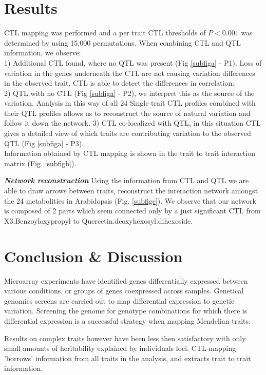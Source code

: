 \documentclass{bioinfo}
\begin{document}
\section{Results}
  CTL mapping was performed and a per trait CTL thresholds of $P < 0.001$ was 
  determined by using 15,000 permutations.
  When combining CTL and QTL information, we observe:\\
  1) Additional CTL found, where no QTL was present (Fig \ref{subfiga} - P1). Loss of variation in the genes 
  underneath the CTL are not causing variation differences in the observed trait, CTL is able to 
  detect the differences in correlation.\\
  2) QTL with no CTL (Fig \ref{subfiga} - P2), we interpret this as the source of the variation. Analysis in this way of 
  all 24 Single trait CTL profiles combined with their QTL profiles allows us to reconstruct the 
  source of natural variation and follow it down the network.
  3) CTL co-localized with QTL, in this situation CTL gives a detailed view of which traits 
  are contributing variation to the observed QTL  (Fig \ref{subfiga} - P3).\\
  
  Information obtained by CTL mapping is shown in the trait to trait interaction matrix (Fig. \ref{subfigb}).

\emph{ {\bf Network reconstruction}}
  Using the information from CTL and QTL we are able to draw arrows between traits, reconstruct the interaction 
  network amongst the 24 metabolities in Arabidopsis (Fig. \ref{subfigc}). We observe that our network is 
  composed of 2 parts which seem connected only by a just significant CTL from X3.Benzoyloxypropyl to 
  Quercetin.deoxyhexosyl.dihexoside.

\section{Conclusion \& Discussion}
  Microarray experiments have identified genes differentially expressed between various 
  conditions, or groups of genes coexpressed across samples. Genetical genomics screens 
  are carried out to map differential expression to genetic variation. Screening 
  the genome for genotype combinations for which there is differential expression is 
  a successful strategy when mapping Mendelian traits. 
  
  Results on complex traits however have been less then satisfactory with only small 
  amounts of heritability explained by individuals loci. CTL mapping 'borrows'
  information from all traits in the analysis, and extracts trait to trait 
   information.
 
\end{document}
